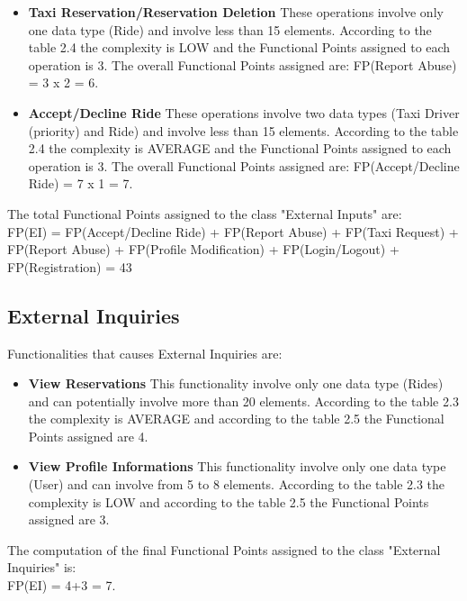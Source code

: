 \documentclass[../../../../projectPlan.tex]{subfiles}
\begin{document}
\begin{itemize}
				\item \textbf{Taxi Reservation/Reservation Deletion}
				      These operations involve only one data type (Ride) and involve less than 15 elements.
				      According to the table 2.4 the complexity is LOW and the Functional Points assigned to each operation is 3.
				      The overall Functional Points assigned are: FP(Report Abuse) = 3 x 2 = 6.

				\item \textbf{Accept/Decline Ride}
				      These operations involve two data types (Taxi Driver (priority) and Ride) and involve less than 15 elements.
				      According to the table 2.4 the complexity is AVERAGE and the Functional Points assigned to each operation is 3.
				      The overall Functional Points assigned are: FP(Accept/Decline Ride) = 7 x 1 = 7.
			\end{itemize}
			The total Functional Points assigned to the class "External Inputs" are: \\
			FP(EI) = FP(Accept/Decline Ride) + FP(Report Abuse) + FP(Taxi Request) + FP(Report Abuse) + FP(Profile Modification) + FP(Login/Logout) + FP(Registration) = 43

		\subsection{External Inquiries}
			Functionalities that causes External Inquiries are:
			\begin{itemize}
				\item \textbf{View Reservations}
				      This functionality involve only one data type (Rides) and can potentially involve more than 20 elements. According to the table 2.3 the complexity is AVERAGE and according to the table 2.5 the Functional Points assigned are 4.

				\item \textbf{View Profile Informations}
				      This functionality involve only one data type (User) and can involve from 5 to 8 elements. According to the table 2.3 the complexity is LOW and according to the table 2.5 the Functional Points assigned are 3.
			\end{itemize}

			The computation of the final Functional Points assigned to the class "External Inquiries" is:\\
			FP(EI) = 4+3 = 7.
\end{document}
